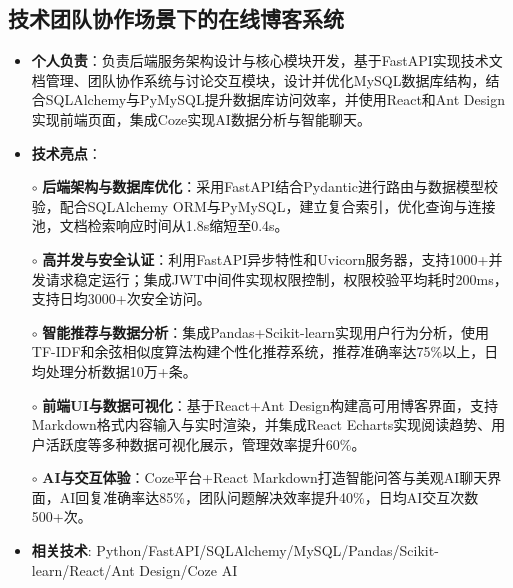 \subsection{\textbf{技术团队协作场景下的在线博客系统} \hspace{2cm}{2025.06 -- 2025.07}}
  \begin{normalsize}
    \begin{itemize}
    \item \textbf{个人负责}：负责后端服务架构设计与核心模块开发，基于FastAPI实现技术文档管理、团队协作系统与讨论交互模块，设计并优化MySQL数据库结构，结合SQLAlchemy与PyMySQL提升数据库访问效率，并使用React和Ant Design实现前端页面，集成Coze实现AI数据分析与智能聊天。
    \item \textbf{技术亮点}：
    \setlength{\itemindent}{1em} %
      \item[$\circ$] \textbf{后端架构与数据库优化}：采用FastAPI结合Pydantic进行路由与数据模型校验，配合SQLAlchemy ORM与PyMySQL，建立复合索引，优化查询与连接池，文档检索响应时间从1.8s缩短至0.4s。
      \item[$\circ$] \textbf{高并发与安全认证}：利用FastAPI异步特性和Uvicorn服务器，支持1000+并发请求稳定运行；集成JWT中间件实现权限控制，权限校验平均耗时200ms，支持日均3000+次安全访问。
      \item[$\circ$] \textbf{智能推荐与数据分析}：集成Pandas+Scikit-learn实现用户行为分析，使用TF-IDF和余弦相似度算法构建个性化推荐系统，推荐准确率达75\%以上，日均处理分析数据10万+条。
      \item[$\circ$] \textbf{前端UI与数据可视化}：基于React+Ant Design构建高可用博客界面，支持Markdown格式内容输入与实时渲染，并集成React Echarts实现阅读趋势、用户活跃度等多种数据可视化展示，管理效率提升60\%。
      \item[$\circ$] \textbf{AI与交互体验}：Coze平台+React Markdown打造智能问答与美观AI聊天界面，AI回复准确率达85\%，团队问题解决效率提升40\%，日均AI交互次数500+次。
    \setlength{\itemindent}{0em} %
    \item \textbf{相关技术}: Python/FastAPI/SQLAlchemy/MySQL/Pandas/Scikit-learn/React/Ant Design/Coze AI
    \end{itemize}
  \end{normalsize}